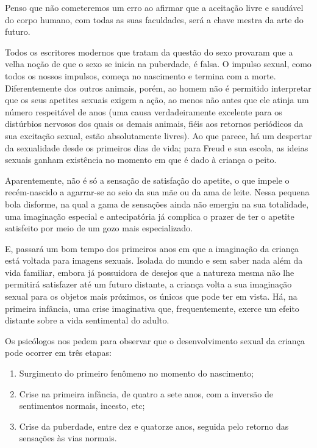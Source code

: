 Penso que não cometeremos um erro ao afirmar que a aceitação livre e
saudável do corpo humano, com todas as suas faculdades, será a chave
mestra da arte do futuro.

\asterisc

Todos os escritores modernos que tratam da questão do sexo provaram que
a velha noção de que o sexo se inicia na puberdade, é falsa. O impulso
sexual, como todos os nossos impulsos, começa no nascimento e termina
com a morte. Diferentemente dos outros animais, porém, ao homem não é
permitido interpretar que os seus apetites sexuais exigem a ação, ao
menos não antes que ele atinja um número respeitável de anos (uma causa
verdadeiramente excelente para os distúrbios nervosos dos quais os
demais animais, fiéis aos retornos periódicos da sua excitação sexual,
estão absolutamente livres). Ao que parece, há um despertar da
sexualidade desde os primeiros dias de vida; para Freud e sua escola, as
ideias sexuais ganham existência no momento em que é dado à criança o
peito.

Aparentemente, não é só a sensação de satisfação do apetite, o que
impele o recém-nascido a agarrar-se ao seio da sua mãe ou da ama de
leite. Nessa pequena bola disforme, na qual a gama de sensações ainda
não emergiu na sua totalidade, uma imaginação especial e antecipatória
já complica o prazer de ter o apetite satisfeito por meio de um gozo
mais especializado.

E, passará um bom tempo dos primeiros anos em que a imaginação da
criança está voltada para imagens sexuais. Isolada do mundo e sem saber
nada além da vida familiar, embora já possuidora de desejos que a
natureza mesma não lhe permitirá satisfazer até um futuro distante, a
criança volta a sua imaginação sexual para os objetos mais próximos, os
únicos que pode ter em vista. Há, na primeira infância, uma crise
imaginativa que, frequentemente, exerce um efeito distante sobre a vida
sentimental do adulto.

Os psicólogos nos pedem para observar que o desenvolvimento sexual da
criança pode ocorrer em três etapas:

\begin{enumerate}
\item Surgimento do primeiro fenômeno no momento do nascimento;

\item Crise na primeira infância, de quatro a sete anos, com a inversão de
sentimentos normais, incesto, etc;

\item Crise da puberdade, entre dez e quatorze anos, seguida pelo retorno
das sensações às vias normais.
\end{enumerate}

